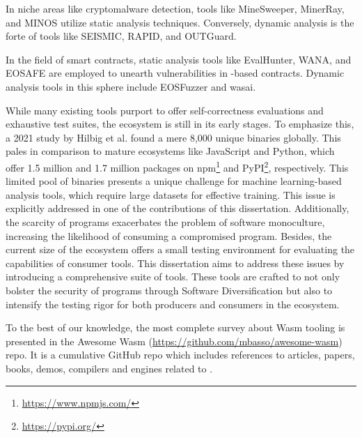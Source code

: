  In niche areas like cryptomalware detection, tools like MineSweeper\cite{Minesweeper}, MinerRay\cite{MinerRay}, and MINOS\cite{MINOS} utilize static analysis techniques. 
Conversely, dynamic analysis is the forte of tools like SEISMIC\cite{SEISMIC}, RAPID\cite{RAPID}, and OUTGuard\cite{outguard}.

 In the field of smart contracts, static analysis tools like EvalHunter\cite{evalhunter}, WANA\cite{wana}, and EOSAFE\cite{eosafe} are employed to unearth vulnerabilities in \Wasm-based contracts. Dynamic analysis tools in this sphere include EOSFuzzer\cite{eosfuzzer} and wasai\cite{wasai}.


 

While many existing tools purport to offer self-correctness evaluations and exhaustive test suites, the \Wasm ecosystem is still in its early stages. 
To emphasize this, a 2021 study by Hilbig et al.\cite{Hilbig2021AnES} found a mere 8,000 unique \Wasm binaries globally. 
This pales in comparison to mature ecosystems like JavaScript and Python, which offer 1.5 million and 1.7 million packages on npm\footnote{\url{https://www.npmjs.com/}} and PyPI\footnote{\url{https://pypi.org/}}, respectively.
This limited pool of \Wasm binaries presents a unique challenge for machine learning-based analysis tools, which require large datasets for effective training. 
This issue is explicitly addressed in one of the contributions of this dissertation\cite{EVASION}.
Additionally, the scarcity of \Wasm programs exacerbates the problem of software monoculture, increasing the likelihood of consuming a compromised \Wasm program\cite{YourCitationHere}.
Besides, the current size of the \Wasm ecosystem offers a small testing environment for evaluating the capabilities of consumer tools.
This dissertation aims to address these issues by introducing a comprehensive suite of tools. 
These tools are crafted to not only bolster the security of \Wasm programs through Software Diversification but also to intensify the testing rigor for both producers and consumers in the ecosystem.


To the best of our knowledge, the most complete survey about Wasm  tooling is presented in the Awesome Wasm  (\url{https://github.com/mbasso/awesome-wasm}) repo. It is a cumulative GitHub repo which includes references to articles, papers, books, demos, compilers and engines related to \wasm. 

